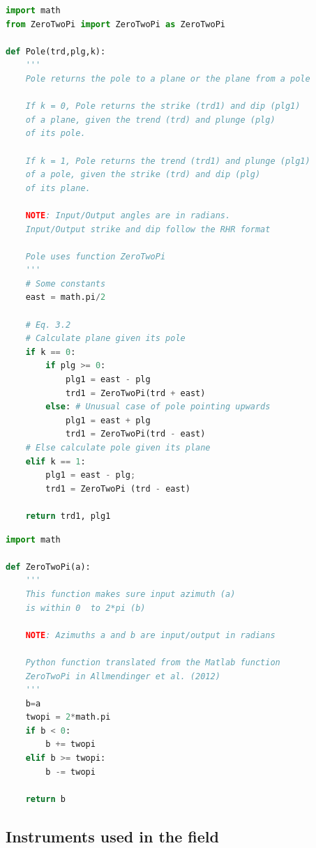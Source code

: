 \documentclass[a4paper , 12pt]{book}
\begin{document}
\begin{center}
\begin{lstlisting}[language=Python, frame=single]
import math
from ZeroTwoPi import ZeroTwoPi as ZeroTwoPi

def Pole(trd,plg,k):
    '''
    Pole returns the pole to a plane or the plane from a pole  

    If k = 0, Pole returns the strike (trd1) and dip (plg1)
    of a plane, given the trend (trd) and plunge (plg) 
    of its pole.

    If k = 1, Pole returns the trend (trd1) and plunge (plg1) 
    of a pole, given the strike (trd) and dip (plg) 
    of its plane.

    NOTE: Input/Output angles are in radians. 
    Input/Output strike and dip follow the RHR format

    Pole uses function ZeroTwoPi
    '''
    # Some constants
    east = math.pi/2

    # Eq. 3.2
    # Calculate plane given its pole
    if k == 0:
        if plg >= 0:
            plg1 = east - plg
            trd1 = ZeroTwoPi(trd + east)
        else: # Unusual case of pole pointing upwards
            plg1 = east + plg
            trd1 = ZeroTwoPi(trd - east) 
    # Else calculate pole given its plane
    elif k == 1:
    	plg1 = east - plg;
    	trd1 = ZeroTwoPi (trd - east)
        
    return trd1, plg1
\end{lstlisting}
\end{center}

\begin{center}
\begin{lstlisting}[language=Python, frame=single]
import math

def ZeroTwoPi(a):
    '''
    This function makes sure input azimuth (a)
    is within 0  to 2*pi (b)
    
    NOTE: Azimuths a and b are input/output in radians
    
    Python function translated from the Matlab function 
    ZeroTwoPi in Allmendinger et al. (2012)
    '''
    b=a
    twopi = 2*math.pi
    if b < 0:
        b += twopi
    elif b >= twopi:
        b -= twopi
        
    return b
\end{lstlisting}    
\end{center}

\subsection{Instruments used in the field}
\end{document}
